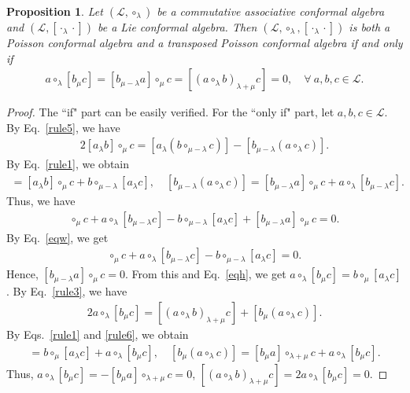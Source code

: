 \documentclass[11pt,letterpaper,reqno]{amsart}
\newtheorem{proposition}[theorem]{Proposition}
\theoremstyle{definition}
\numberwithin{equation}{section}
\begin{document}
\begin{proposition}
   Let $(\mathcal{L} ,\circ_\lambda)$ be a commutative associative conformal algebra and $(\mathcal{L} ,[\cdot_{\lambda}\cdot])$ be a Lie conformal algebra.
   Then $(\mathcal{L} ,\circ_\lambda,[\cdot_{\lambda}\cdot])$ is both a Poisson conformal algebra and a transposed Poisson conformal algebra if and only if
   \begin{align*}
      a\circ_{\lambda}[b_{\mu}c]=[b_{\mu-\lambda}a]\circ_{\mu}c=[(a\circ_{\lambda}b)_{\lambda+\mu}c]=0, \quad \forall ~a,b,c\in \mathcal{L}.
   \end{align*}
\end{proposition}

\begin{proof}
   The ``if" part can be easily verified. For the ``only if" part, let $a,b,c\in \mathcal{L}$. By Eq.~\eqref{rule5}, we have
   \begin{align*}
      2[a_{\lambda}b]\circ_{\mu}c=[a_{{\lambda}}(b\circ_{\mu-\lambda}c)]-[b_{\mu-\lambda}(a\circ_{\lambda}c)].
   \end{align*}
   By Eq.~\eqref{rule1}, we obtain
   \begin{align*}
      [a_{\lambda}(b\circ_{\mu-\lambda}c)]=[a_{\lambda}b]\circ_{\mu}c+b\circ_{\mu-\lambda}[a_{\lambda}c],  \quad
      [b_{\mu-\lambda}(a\circ_{\lambda}c)]=[b_{\mu-\lambda}a]\circ_{\mu}c+a\circ_{\lambda}[b_{\mu-\lambda}c].
   \end{align*}
   Thus, we have
   \begin{align*}
      [a_{\lambda}b]\circ_{\mu}c+a\circ_{\lambda}[b_{\mu-\lambda}c]-b\circ_{\mu-\lambda}[a_{\lambda}c]+[b_{\mu-\lambda}a]\circ_{\mu}c=0.
   \end{align*}
   By Eq.~\eqref{eqw}, we get
   \begin{align*}
      [a_{\lambda}b]\circ_{\mu}c+a\circ_{\lambda}[b_{\mu-\lambda}c]-b\circ_{\mu-\lambda}[a_{\lambda}c]=0.
   \end{align*}
   Hence, $[b_{\mu-\lambda}a]\circ_{\mu}c=0$. From this and Eq.~\eqref{eqh}, we get $a\circ_{\lambda}[b_{\mu}c]=b \circ_{\mu} [a _\lambda c]$. By Eq.~\eqref{rule3}, we have
   \begin{align*}
      2a\circ_{\lambda}[b_{\mu}c]=[(a\circ_{\lambda}b)_{\lambda+\mu}c]+[b_{\mu}(a\circ_{\lambda}c)].	
   \end{align*}
   By Eqs.~\eqref{rule1} and \eqref{rule6}, we obtain
   \begin{align*}
      [(a\circ_{\lambda}b)_{\lambda+\mu}c] = b \circ_{\mu} [a _\lambda c] + a \circ_\lambda [b _{\mu} c],  \quad
      [b_{\mu}(a\circ_{\lambda}c)] = [b_{\mu}a]\circ_{\lambda+\mu}c+a\circ_{\lambda}[b_{\mu}c].
   \end{align*}
   Thus, $a\circ_{\lambda}[b_{\mu}c]=-[b_{\mu}a]\circ_{\lambda+\mu}c=0$, $[(a\circ_{\lambda}b)_{\lambda+\mu}c]=2a\circ_{\lambda}[b_{\mu}c]=0$.
\end{proof}
\end{document}
